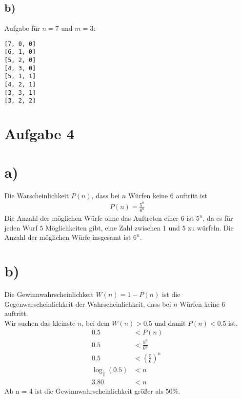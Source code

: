 \documentclass[a4paper]{scrartcl}
\begin{document}
\subsection*{b)}
Aufgabe für $n = 7$ und $m = 3$:
\begin{lstlisting}
[7, 0, 0]
[6, 1, 0]
[5, 2, 0]
[4, 3, 0]
[5, 1, 1]	
[4, 2, 1]
[3, 3, 1]
[3, 2, 2]
\end{lstlisting}

\section*{Aufgabe 4}
\section*{a)}
Die Warscheinlichkeit $P(n)$, dass bei $n$ Würfen keine $6$ auftritt ist 
\begin{align*}
	P(n) = \frac{5^n}{6^n}
\end{align*}
Die Anzahl der möglichen Würfe ohne das Auftreten einer $6$ ist $5^n$, da es für jeden Wurf $5$ 
Möglichkeiten gibt, eine Zahl zwischen $1$ und $5$ zu würfeln. Die Anzahl der möglichen Würfe 
insgesamt ist $6^n$.	

\section*{b)}
Die Gewinnwahrscheinlichkeit $W(n) = 1 - P(n)$ ist die Gegenwarscheinlichkeit der Wahrscheinlichkeit, 
dass bei $n$ Würfen keine $6$ auftritt. \\
Wir suchen das kleinste $n$, bei dem $W(n) > 0.5$ und damit $ P(n) < 0.5$ ist.
\begin{align*}
	0.5 &< P(n) \\
	0.5 &< \frac{5^n}{6^n} \\
	0.5 &< \left(\frac{5}{6}\right)^n \\
	\log_{\frac{5}{6}}(0.5) &< n \\
	3.80 &< n
\end{align*} 
Ab n = 4 ist die Gewinnwahrscheinlichkeit größer als $50\%$.
\end{document}
